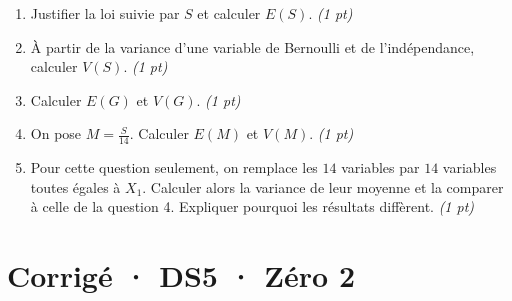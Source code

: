 \begin{enumerate}

\item Justifier la loi suivie par $S$ et calculer $E(S)$. \hfill\textit{(1 pt)}

\item À partir de la variance d'une variable de Bernoulli et de l'indépendance, calculer $V(S)$. \hfill\textit{(1 pt)}

\item Calculer $E(G)$ et $V(G)$. \hfill\textit{(1 pt)}

\item On pose $M=\frac S{14}$. Calculer $E(M)$ et $V(M)$. \hfill\textit{(1 pt)}

\item Pour cette question seulement, on remplace les $14$ variables par $14$ variables toutes égales à $X_1$. Calculer alors la variance de leur moyenne et la comparer à celle de la question 4. Expliquer pourquoi les résultats diffèrent. \hfill\textit{(1 pt)}

\end{enumerate}

\ifmxteacher\mxnewpage

\section*{Corrigé · DS5 · Zéro 2}\label{cor:7-2}

